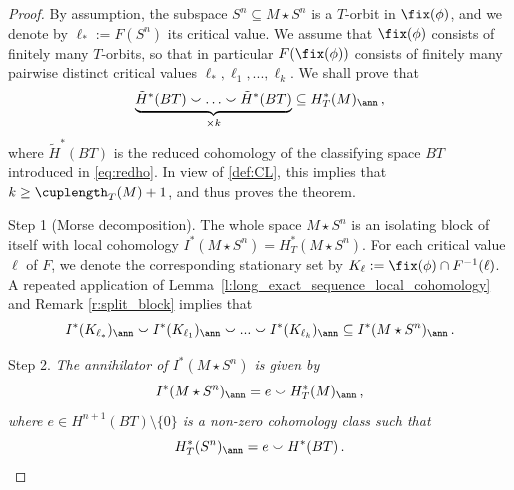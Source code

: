 \documentclass[11pt,a4paper,reqno]{article}
\numberwithin{equation}{section}
\theoremstyle{definition}
\begin{document}
\begin{proof}
By assumption, the subspace $S^n\subseteq M\star S^n$ is a $T$-orbit in $\fix(\phi)$, and we denote by $ \ell_*:=F(S^n)$ its critical value. We assume that $\fix(\phi)$ consists of finitely many $T$-orbits, so that  in particular  $F(\fix(\phi))$ consists of finitely many pairwise distinct 
critical values $\ell_*,\ell_1,...,\ell_k$. We shall prove that 
\begin{equation}\label{ciochevoglio}
\underbrace{\tilde H^*(BT)
\smallsmile \ldots \smallsmile
\tilde H^*(BT)}_{\times k}
\subseteq 
 H^*_{T}(M)_\ann \, ,
 \end{equation}
 where $\tilde H^*(BT)$ is the reduced cohomology  of the classifying space $BT$ introduced in  \eqref{eq:redho}.
In view of \eqref{def:CL}, this implies that $k\geq \cuplength_{T}(M) + 1 $, and thus proves the theorem.
\smallskip 

\noindent
{\sc Step 1 (Morse decomposition).}
The whole space $M\star S^n$ is an isolating block of itself with local cohomology
$I^*(M\star S^n)=H^*_{T}(M \star S^n)$.
For each critical value $ \ell $ of $F$, we denote the corresponding stationary set by $K_{\ell}:=\fix(\phi)\cap F^{-1}(\ell)$. 
A repeated application of Lemma~\ref{l:long_exact_sequence_local_cohomology} and Remark \ref{r:split_block} implies that 
\begin{equation}\label{morsedeco}
I^*(K_{\ell_*})_\ann
\smallsmile
I^*(K_{\ell_1})_\ann 
\smallsmile ...\smallsmile 
I^*(K_{\ell_k})_\ann
\subseteq
I^*(M \star S^n)_\ann \, .
\end{equation}


\noindent
{\sc Step 2.} {\it The  annihilator of $I^*(M \star S^n)$ is given by
}
\begin{equation}
\label{e:ann_K_LS}
I^*(M \star S^n)_\ann =  e\smallsmile H^*_{T}(M)_\ann \, ,
\end{equation}
{\it where 
$e\in H^{n+1}(BT)\setminus\{0\}$ is a 
non-zero cohomology class such that} 
\begin{equation}
\label{e:ann_crit_LS_0}
H^*_{T}(S^n)_\ann=e\smallsmile H^*(BT) \, .
\end{equation}




\end{proof}
\end{document}
